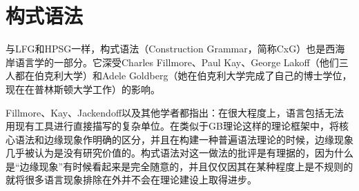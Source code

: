 
\chapter{构式语法}
\label{Kapitel-CxG}

%
%
%
%

与LFG和HPSG一样，构式语法（Construction Grammar，简称CxG）也是西海岸语言学的一部分。它深受Charles Fillmore、Paul Kay、George Lakoff（他们三人都在伯克利大学）和Adele Goldberg（她在伯克利大学完成了自己的博士学位，现在在普林斯顿大学工作）\citep*{Fillmore88a,FKoC88a,KF99a,Kay2002a,Kay2005a,Goldberg95a,Goldberg2006a}的影响。

Fillmore、Kay、Jackendoff以及其他学者都指出：在很大程度上，语言包括无法用现有工具进行直接描写的复杂单位。在类似于GB理论这样的理论框架中，将核心语法和边缘现象作明确的区分\citep[]{Chomsky81a}，并且在构建一种普遍语法理论的时候，边缘现象几乎被认为是没有研究价值的。构式语法对这一做法的批评是有理据的，因为什么是“边缘现象”有时候看起来是完全随意的\citep{MuellerKernigkeit}，并且仅仅因其在某种程度上是不规则的就将很多语言现象排除在外并不会在理论建设上取得进步。

